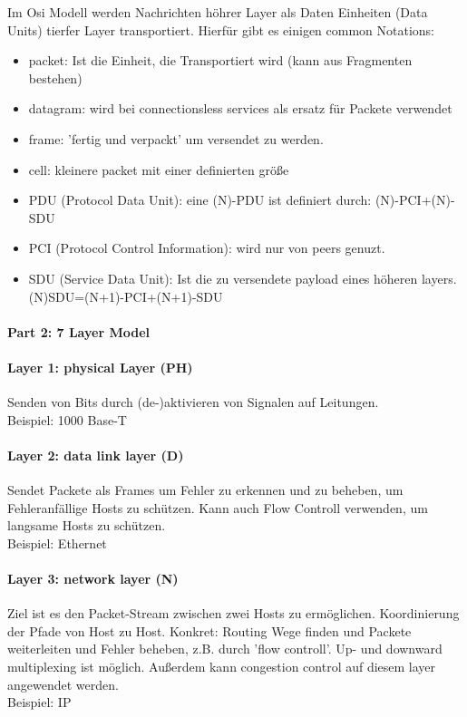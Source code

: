 				Im Osi Modell werden Nachrichten höhrer Layer als Daten Einheiten (Data Units) tierfer Layer transportiert. Hierfür gibt es einigen common Notations: 
				\begin{itemize}
					\item packet: Ist die Einheit, die Transportiert wird (kann aus Fragmenten bestehen)
					\item datagram: wird bei connectionsless services als ersatz für Packete verwendet
					\item frame: 'fertig und verpackt' um versendet zu werden.
					\item cell: kleinere packet mit einer definierten größe
					\item PDU (Protocol Data Unit): eine (N)-PDU ist definiert durch: (N)-PCI+(N)-SDU
					\item PCI (Protocol Control Information): wird nur von peers genuzt.
					\item SDU (Service Data Unit): Ist die zu versendete payload eines höheren layers. (N)SDU=(N+1)-PCI+(N+1)-SDU
				\end{itemize}
			\paragraph{Part 2: 7 Layer Model}
				\paragraph{Layer 1: physical Layer (PH)}
					Senden von Bits durch (de-)aktivieren von Signalen auf Leitungen. \\
					Beispiel: 1000 Base-T
				
				\paragraph{Layer 2: data link layer (D)}
					Sendet Packete als Frames um Fehler zu erkennen und zu beheben, um Fehleranfällige Hosts zu schützen. Kann auch Flow Controll verwenden, um langsame Hosts zu schützen. \\
					Beispiel: Ethernet
				
				\paragraph{Layer 3: network layer (N)}
					Ziel ist es den Packet-Stream zwischen zwei Hosts zu ermöglichen. Koordinierung der Pfade von Host zu Host. Konkret: Routing Wege finden und Packete weiterleiten und Fehler beheben, z.B. durch 'flow controll'. Up- und downward multiplexing ist möglich. Außerdem kann congestion control auf diesem layer angewendet werden.\\
					Beispiel: IP
